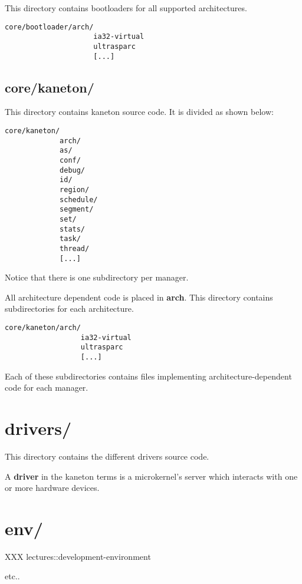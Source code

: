 This directory contains bootloaders for all supported architectures.

\begin{verbatim}
core/bootloader/arch/
                     ia32-virtual
                     ultrasparc
                     [...]
\end{verbatim}

%
%

\subsection{core/kaneton/}

This directory contains kaneton source code. It is divided as shown below:

\begin{verbatim}
core/kaneton/
             arch/
             as/
             conf/
             debug/
             id/
             region/
             schedule/
             segment/
             set/
             stats/
             task/
             thread/
             [...]
\end{verbatim}

Notice that there is one subdirectory per manager.

All architecture dependent code is placed in \textbf{arch}. This
directory contains subdirectories for each architecture.

\begin{verbatim}
core/kaneton/arch/
                  ia32-virtual
                  ultrasparc
                  [...]
\end{verbatim}

Each of these subdirectories contains files implementing
architecture-dependent code for each manager.

%
%

\section{drivers/}

This directory contains the different drivers source code.

A \textbf{driver} in the kaneton terms is a microkernel's server which
interacts with one or more hardware devices.

%
%

\section{env/}

XXX lectures::development-environment

etc..
